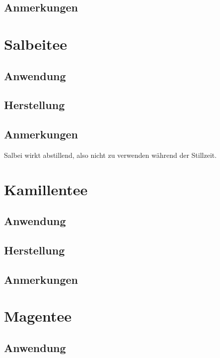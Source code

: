 \subsection{Anmerkungen}




\section{Salbeitee}

\subsection{Anwendung}

\subsection{Herstellung}

\subsection{Anmerkungen}

Salbei wirkt abstillend, also nicht zu verwenden während der Stillzeit.





\section{Kamillentee}

\subsection{Anwendung}

\subsection{Herstellung}

\subsection{Anmerkungen}






\section{Magentee}

\subsection{Anwendung}

